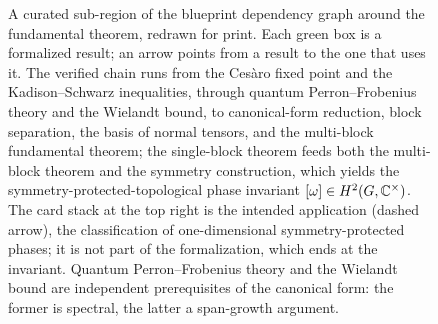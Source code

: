 \begin{figure}[htbp]
    \caption{A curated sub-region of the blueprint dependency graph around the
        fundamental theorem, redrawn for print. Each green box is a formalized
        result; an arrow points from a result to the one that uses it. The verified chain
        runs from the Ces\`aro fixed point and the Kadison--Schwarz inequalities,
        through quantum Perron--Frobenius theory and the Wielandt bound, to
        canonical-form reduction,
        block separation, the
        basis of normal tensors,
        and the multi-block fundamental theorem; the single-block theorem feeds
        both the multi-block theorem and the symmetry construction, which
        yields the symmetry-protected-topological phase invariant
        $[\omega]\in H^2(G,\mathbb{C}^\times)$.
        The card stack at the top right is the intended application (dashed arrow), the classification of
        one-dimensional symmetry-protected phases; it is not part of the formalization, which ends at the invariant.
        Quantum Perron--Frobenius theory and the
        Wielandt bound are independent prerequisites of the canonical form: the
        former is spectral, the latter a span-growth argument.}\label{fig:depgraph}
\end{figure}

